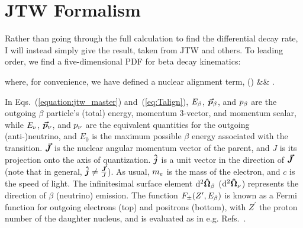 \section[JTW Formalism]{JTW Formalism}
\label{sec:jtw_formalism}
Rather than going through the full calculation to find the differential decay rate, I will instead simply give the result, taken from \ac{JTW} and others\cite{LeeYang}\cite{jtw}\cite{jtw_coulomb}\cite{EbelFeldman1957}.  To leading order, we find a five-dimensional \ac{PDF} for beta decay kinematics:  
%
%
%
%
%

where, for convenience, we have defined a nuclear alignment term,
\bea
\Talign(\vecJ) &\equiv& \TalignExpand.
\label{eq:Talign}
\eea
{}

In Eqs.~(\ref{equation:jtw_master}) and~(\ref{eq:Talign}), $E_{\beta}$, $\bm{\vec{p}}_{\beta}$, and $p_{\beta}$ are the outgoing $\beta$ particle's (total) energy, momentum 3-vector, and momentum scalar, while $E_{\nu}$, $\bm{\vec{p}}_{\nu}$, and $p_{\nu}$ are the equivalent quantities for the outgoing (anti-)neutrino, and $E_0$ is the maximum possible $\beta$ energy associated with the transition.   $\bm{\vec{J}}$ is the nuclear angular momentum vector of the parent, and $J$ is its projection onto the axis of quantization. $\bm{\hat{j}}$ is a unit vector in the direction of $\bm{\vec{J}}$ (note that in general, $\bm{\hat{j}} \neq \frac{\bm{\vec{J}}}{J}$).  As usual, $m_e$ is the mass of the electron, and $c$ is the speed of light.  The infinitesimal surface element $\mathrm{d}^{2} \bm{\hat{\Omega}}_\beta$ ($\mathrm{d}^{2} \bm{\hat{\Omega}}_\nu$) represents the direction of $\beta$ (neutrino) emission.  The function $F_{\pm}(Z^\prime, E_\beta)$ is known as a Fermi function for outgoing electrons (top) and positrons (bottom), with $Z^\prime$ the proton number of the daughter nucleus, and is evaluated as in e.g. Refs.~\cite{wilkinson2}\cite{wilkinson3}\cite{wilkinson4}. 

